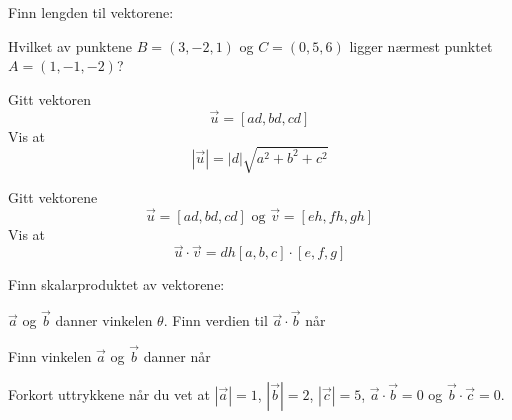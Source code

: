 




\opgt

\nes
{}
Finn lengden til vektorene:\os
{}
	
Hvilket av punktene $ {B=(3, -2, 1)} $ og $ {C=(0, 5, 6) }$ ligger nærmest punktet $ {A=(1, -1, -2)} $?

Gitt vektoren
\[ \vec{u}=[ad, bd, cd]\]
Vis at
\[ |\vec{u}|=|d|\sqrt{a^2 + b^2 + c^2} \]



\nes
{}
Gitt vektorene
\[ \vec{u}=[ad, bd, cd] \text{ og } \vec{v}=[eh, fh, gh] \]
Vis at
\[ \vec{u}\cdot\vec{v}=dh[a, b, c]\cdot[e, f, g] \] \vs

Finn skalarproduktet av vektorene:\os
{}


\newpage
{}
$ \vec{a} $ og $ \vec{b} $ danner vinkelen $ \theta $. Finn verdien til $\vec{a}\cdot\vec{b}$ når\os
{}




Finn vinkelen $ \vec{a} $ og $ \vec{b} $ danner når\os
{}


Forkort uttrykkene når du vet at $ |\vec{a}|=1 $, $ |\vec{b}|=2 $, $ |\vec{c}|=5 $, $ \vec{a}\cdot\vec{b}=0 $ og $ \vec{b}\cdot\vec{c}=0 $.\os
{}



